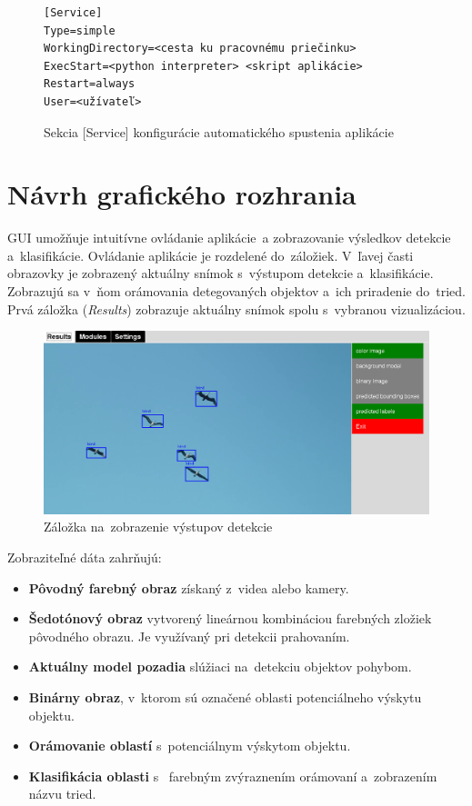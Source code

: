         \begin{figure}[H]
            \centering
            \begin{lstlisting}
[Service]
Type=simple
WorkingDirectory=<cesta ku pracovnému priečinku>
ExecStart=<python interpreter> <skript aplikácie>
Restart=always
User=<užívateľ>
            \end{lstlisting}
            \caption{Sekcia [Service] konfigurácie automatického spustenia aplikácie}
        \end{figure}

    \section{Návrh grafického rozhrania}
        \ac{GUI} umožňuje intuitívne ovládanie aplikácie~a zobrazovanie výsledkov detekcie a~klasifikácie. Ovládanie aplikácie je rozdelené do~záložiek. V~ľavej časti obrazovky je zobrazený aktuálny snímok s~výstupom detekcie a~klasifikácie. Zobrazujú sa v~ňom orámovania detegovaných objektov a~ich priradenie do~tried. Prvá záložka (\emph{Results}) zobrazuje aktuálny snímok spolu s~vybranou vizualizáciou.

        \begin{figure}[H]
            \centering
            \includegraphics[width=\textwidth]{obrazky/new_app/classification.png}
            \caption{Záložka na~zobrazenie výstupov detekcie}
        \end{figure}

        Zobraziteľné dáta zahrňujú:
        \begin{itemize}
            \item \textbf{Pôvodný farebný obraz} získaný z~videa alebo kamery.
            \item \textbf{Šedotónový obraz} vytvorený lineárnou kombináciou farebných zložiek pôvodného obrazu. Je využívaný pri detekcii prahovaním.
            \item \textbf{Aktuálny model pozadia} slúžiaci na~detekciu objektov pohybom.
            \item \textbf{Binárny obraz}, v~ktorom sú označené oblasti potenciálneho výskytu objektu.
            \item \textbf{Orámovanie oblastí} s~potenciálnym výskytom objektu. 
            \item \textbf{Klasifikácia oblasti} s~ farebným zvýraznením orámovaní a~zobrazením názvu tried.
        \end{itemize}

